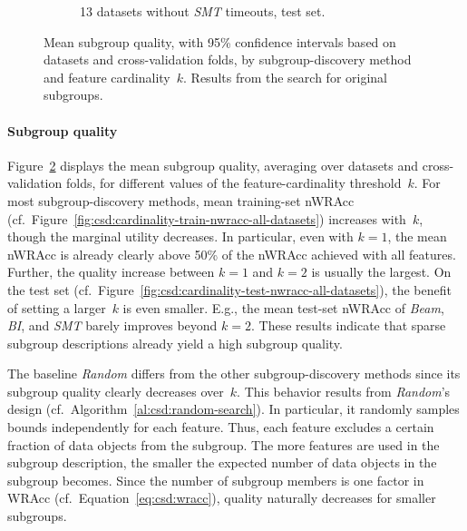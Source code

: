 \documentclass{article}
\theoremstyle{definition}
\begin{document}
\begin{figure}[t]
\begin{subfigure}[t]{0.48\textwidth}
		\caption{13 datasets without \emph{SMT} timeouts, test set.}
		\label{fig:csd:cardinality-test-nwracc-no-timeout-datasets}
	\end{subfigure}
	\caption{
		Mean subgroup quality, with 95\% confidence intervals based on datasets and cross-validation folds, by subgroup-discovery method and feature cardinality~$k$.
		Results from the search for original subgroups.
	}
	\label{fig:csd:cardinality-nwracc}
\end{figure}

\paragraph{Subgroup quality}

Figure~\ref{fig:csd:cardinality-nwracc} displays the mean subgroup quality, averaging over datasets and cross-validation folds, for different values of the feature-cardinality threshold~$k$.
For most subgroup-discovery methods, mean training-set nWRAcc (cf.~Figure~\ref{fig:csd:cardinality-train-nwracc-all-datasets}) increases with~$k$, though the marginal utility decreases.
In particular, even with $k=1$, the mean nWRAcc is already clearly above 50\% of the nWRAcc achieved with all features.
Further, the quality increase between $k=1$ and $k=2$ is usually the largest.
On the test set (cf.~Figure~\ref{fig:csd:cardinality-test-nwracc-all-datasets}), the benefit of setting a larger~$k$ is even smaller.
E.g., the mean test-set nWRAcc of \emph{Beam}, \emph{BI}, and \emph{SMT} barely improves beyond $k=2$.
These results indicate that sparse subgroup descriptions already yield a high subgroup quality.

The baseline \emph{Random} differs from the other subgroup-discovery methods since its subgroup quality clearly decreases over~$k$.
This behavior results from \emph{Random}'s design (cf.~Algorithm~\ref{al:csd:random-search}).
In particular, it randomly samples bounds independently for each feature.
Thus, each feature excludes a certain fraction of data objects from the subgroup.
The more features are used in the subgroup description, the smaller the expected number of data objects in the subgroup becomes.
Since the number of subgroup members is one factor in WRAcc (cf.~Equation~\ref{eq:csd:wracc}), quality naturally decreases for smaller subgroups.
\end{document}
